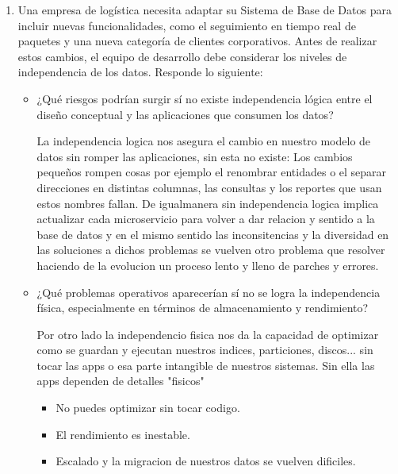 \documentclass[12pt]{report}
\begin{document}
\begin{enumerate}[label=\textbf{\arabic*.}, leftmargin=*]
\begin{enumerate}[label=\textbf{\alph*.}, leftmargin=*, itemsep=1.0em]
\textbf{Recomendación}
Por lo que para una empresa en crecimiento que busca centralizar operaciones de ventas, clientes, inventario y logística, la mejor opción es \textbf{PostgreSQL}, ya que ofrece mayor capacidad de escalabilidad, solidez en el manejo de datos complejos y ausencia de costos de versiones empresariales o licencias. Por que hay que tener en cuenta que MySQL es adecuado para proyectos pequeños o con requerimientos menos complejos, pero PostgreSQL proporciona una base más robusta y preparada para el crecimiento a largo plazo.






\item Una empresa de log\'istica necesita adaptar su Sistema de Base de Datos para incluir nuevas funcionalidades, como el seguimiento en tiempo real de paquetes y una nueva categor\'ia de clientes corporativos. Antes de realizar estos cambios, el equipo de desarrollo debe considerar los niveles de independencia de los datos. Responde lo siguiente:
\begin{itemize}
  \item ¿Qu\'e riesgos podr\'ian surgir s\'i no existe independencia l\'ogica entre el dise\~no conceptual y las aplicaciones que consumen los datos?
  
        La independencia logica nos asegura el cambio en nuestro modelo de datos sin romper las aplicaciones, sin esta no existe:
        Los cambios pequeños rompen cosas por ejemplo el renombrar entidades o el separar direcciones en distintas columnas, las consultas y los reportes que usan estos nombres fallan.
        De igualmanera sin independencia logica implica actualizar cada microservicio para volver a dar relacion y sentido a la base de datos y en el mismo sentido las inconsitencias y la diversidad en las soluciones a dichos problemas se vuelven otro problema que resolver haciendo de la evolucion un proceso lento y lleno de parches y errores.
        
  
  \item ¿Qu\'e problemas operativos aparecer\'ian s\'i no se logra la independencia f\'isica, especialmente en t\'erminos de almacenamiento y rendimiento?

        Por otro lado la independencio fisica nos da la capacidad de optimizar como se guardan y ejecutan nuestros indices, particiones, discos... sin tocar las apps o esa parte intangible de nuestros sistemas. Sin ella las apps dependen de detalles "fisicos"
        \begin{itemize}
            \item No puedes optimizar sin tocar codigo.
            \item El rendimiento es inestable.
            \item Escalado y la migracion de nuestros datos se vuelven dificiles.
        \end{itemize}


\end{itemize}
\end{enumerate}
\end{enumerate}
\end{document}
